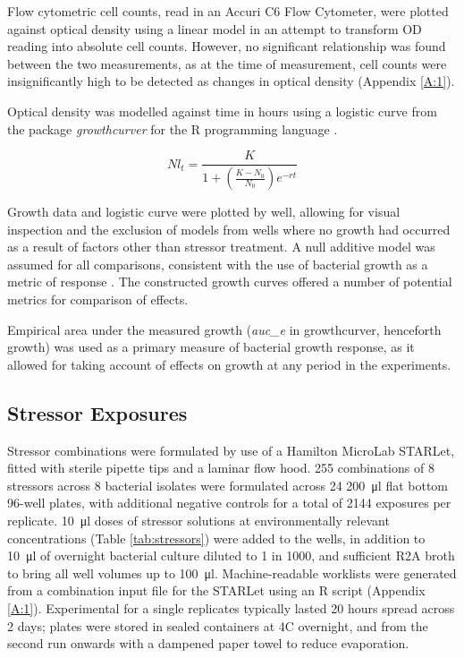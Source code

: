\documentclass[final,1p,times]{elsarticle}
\begin{document}
Flow cytometric cell counts, read in an Accuri C6 Flow Cytometer, were plotted against optical density using a linear model in an attempt to transform OD reading into absolute cell counts. However, no significant relationship was found between the two measurements, as at the time of measurement, cell counts were insignificantly high to be detected as changes in optical density (Appendix \ref{A:1}). 

Optical density was modelled against time in hours using a logistic curve from the package \textit{growthcurver} \cite{Sprouffske2016Package} for the R programming language \cite{RCoreTeam2018R:Computing}.

\begin{equation}
Nl_t=\frac{K}{1 + (\frac{K - N_0}{N_0}) e^{-rt}}
\label{E:log_curve}
\end{equation}

Growth data and logistic curve were plotted by well, allowing for visual inspection and the exclusion of models from wells where no growth had occurred as a result of factors other than stressor treatment. A null additive model was assumed for all comparisons, consistent with the use of bacterial growth as a metric of response \cite{Piggott2015}. The constructed growth curves offered a number of potential metrics for comparison of effects. 

Empirical area under the measured growth (\textit{auc\_e} in growthcurver, henceforth growth) was used as a primary measure of bacterial growth response, as it allowed for taking account of effects on growth at any period in the experiments.

\subsection{Stressor Exposures}
\label{S:2:5}

Stressor combinations were formulated by use of a Hamilton MicroLab STARLet, fitted with sterile  pipette tips and a laminar flow hood. 255 combinations of 8 stressors across 8 bacterial isolates were formulated across 24 \SI{200}{\ul} flat bottom 96-well plates, with additional negative controls for a total of 2144 exposures per replicate. \SI{10}{\ul} doses of stressor solutions at environmentally relevant concentrations (Table \ref{tab:stressors}) were added to the wells, in addition to \SI{10}{\ul} of overnight bacterial culture diluted to 1 in 1000, and sufficient R2A broth to bring all well volumes up to \SI{100}{\ul}. Machine-readable worklists were generated from a combination input file for the STARLet using an R script (Appendix \ref{A:1}). Experimental for a single replicates typically lasted 20 hours spread across 2 days; plates were stored in sealed containers at 4\textdegree C overnight, and from the second run onwards with a dampened paper towel to reduce evaporation.
\end{document}
